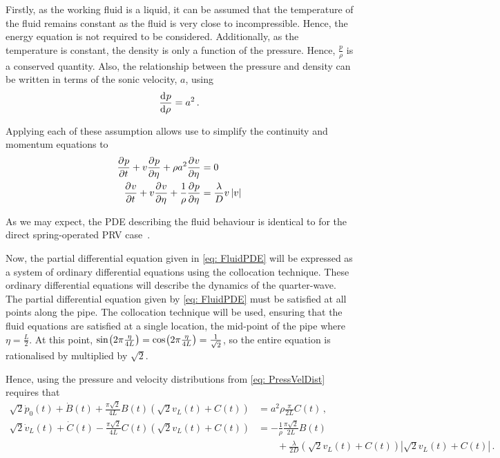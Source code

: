 Firstly, as the working fluid is a liquid, it can be assumed that the temperature of the fluid remains constant as the fluid is very close to incompressible. Hence, the energy equation is not required to be considered. Additionally, as the temperature is constant, the density is only a function of the pressure. Hence, $\frac{p}{\rho}$ is a conserved quantity. Also, the relationship between the pressure and density can be written in terms of the sonic velocity, $a$, using
~
\begin{equation*}
    \diff{p}{\rho} = a^2 \, .
\end{equation*}

Applying each of these assumption allows use to simplify the continuity and momentum equations to
~
\begin{equation} \label{eq: FluidPDE}
\begin{split}
    \pdiff{p}{t} + v \pdiff{p}{\eta} + \rho a^2 \pdiff{v}{\eta} &= 0 \\
    \pdiff{v}{t} + v \pdiff{v}{\eta} + \frac{1}{\rho} \pdiff{p}{\eta} &=  \frac{\lambda}{D} v \left| v \right|
\end{split}
\end{equation}

As we may expect, the PDE describing the fluid behaviour is identical to for the direct spring-operated PRV case~\cite{Hos2015ModelPipe}.

Now, the partial differential equation given in \cref{eq: FluidPDE} will be expressed as a system of ordinary differential equations using the collocation technique. These ordinary differential equations will describe the dynamics of the quarter-wave. The partial differential equation given by \cref{eq: FluidPDE} must be satisfied at all points along the pipe. The collocation technique will be used, ensuring that the fluid equations are satisfied at a single location, the mid-point of the pipe where $\eta = \frac{L}{2}$. At this point, $\fun{sin}{2 \pi \frac{\eta}{4L}} = \fun{cos}{2 \pi \frac{\eta}{4L}} = \frac{1}{\sqrt{2}}$, so the entire equation is rationalised by multiplied by $\sqrt{2}$.

Hence, using the pressure and velocity distributions from \cref{eq: PressVelDist} requires that
~
\begin{equation*}
\begin{split}
    \sqrt{2} \dot{p}_0(t) + \dot{B}(t) + \frac{\pi \sqrt{2}}{4 L} B(t) \left( \sqrt{2} v_L(t) + C(t) \right) &= a^2 \rho \frac{\pi}{2L} C(t) \, , \\
    \sqrt{2} \dot{v}_L(t) + \dot{C}(t) - \frac{\pi \sqrt{2}}{4 L} C(t) \left( \sqrt{2} v_L(t) + C(t) \right) &= - \frac{1}{\rho} \frac{\pi \sqrt{2}}{2 L} B(t) \\
    &\qquad + \frac{\lambda}{2D} \left( \sqrt{2} v_L(t) + C(t) \right) \left| \sqrt{2} v_L(t) + C(t) \right| \, .
\end{split}
\end{equation*}

